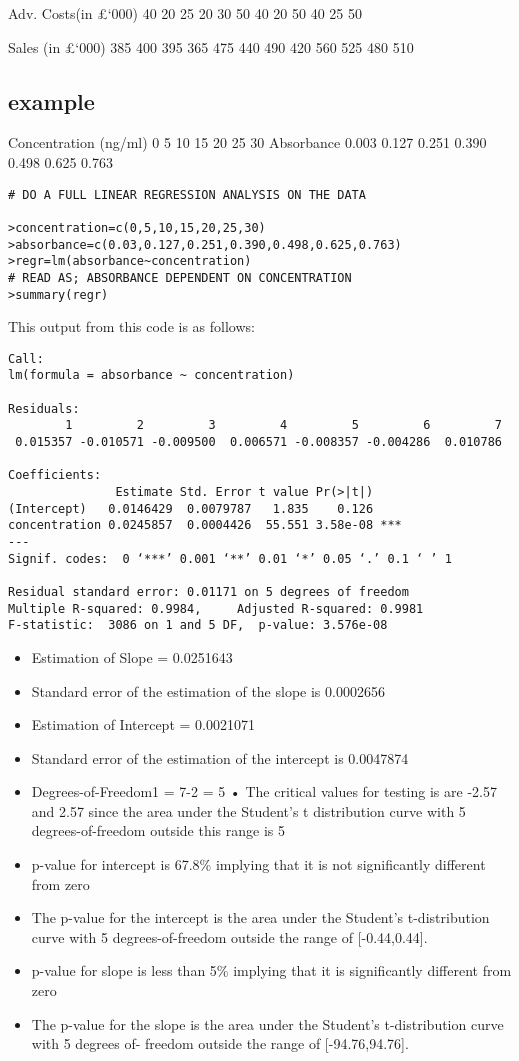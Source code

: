 \documentclass[12pt, a4paper]{report}
\theoremstyle{plain}
\theoremstyle{definition}
\theoremstyle{remark}
\begin{document}
Adv. Costs(in £‘000) 40 20 25 20 30 50 40 20 50 40 25 50

Sales (in £‘000) 385 400 395 365 475 440 490 420 560 525 480 510



\subsection{example}
Concentration (ng/ml) 0 5 10 15 20 25 30
Absorbance 0.003 0.127 0.251 0.390 0.498 0.625 0.763

\begin{verbatim}
# DO A FULL LINEAR REGRESSION ANALYSIS ON THE DATA

>concentration=c(0,5,10,15,20,25,30)
>absorbance=c(0.03,0.127,0.251,0.390,0.498,0.625,0.763)
>regr=lm(absorbance~concentration)
# READ AS; ABSORBANCE DEPENDENT ON CONCENTRATION
>summary(regr)
\end{verbatim}

This output from this code is as follows:
\begin{verbatim}
Call:
lm(formula = absorbance ~ concentration)

Residuals:
        1         2         3         4         5         6         7
 0.015357 -0.010571 -0.009500  0.006571 -0.008357 -0.004286  0.010786

Coefficients:
               Estimate Std. Error t value Pr(>|t|)
(Intercept)   0.0146429  0.0079787   1.835    0.126
concentration 0.0245857  0.0004426  55.551 3.58e-08 ***
---
Signif. codes:  0 ‘***’ 0.001 ‘**’ 0.01 ‘*’ 0.05 ‘.’ 0.1 ‘ ’ 1

Residual standard error: 0.01171 on 5 degrees of freedom
Multiple R-squared: 0.9984,     Adjusted R-squared: 0.9981
F-statistic:  3086 on 1 and 5 DF,  p-value: 3.576e-08

\end{verbatim}


\begin{itemize}
\item Estimation of Slope = 0.0251643 \item  Standard error of the
estimation of the slope is 0.0002656 \item Estimation of Intercept
= 0.0021071 \item Standard error of the estimation of the
intercept is 0.0047874 \item Degrees-of-Freedom1 = 7-2 = 5 • The
critical values for testing is are -2.57 and 2.57 since the area
under the Student’s t distribution
curve with 5 degrees-of-freedom outside this range is 5%
\item p-value for intercept is 67.8\% implying that it is not
significantly different from zero \item The p-value for the
intercept is the area under the Student’s t-distribution curve
with 5 degrees-of-freedom outside the range of [-0.44,0.44]. \item
p-value for slope is less than 5\% implying that it is
significantly different from zero \item The p-value for the slope
is the area under the Student’s t-distribution curve with 5
degrees of- freedom outside the range of [-94.76,94.76].
\end{itemize}
\end{document}
